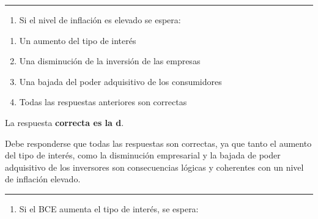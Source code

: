 \documentclass[
  letterpaper,
  DIV=11,
  numbers=noendperiod]{scrreprt}
\providecommand{\tightlist}{%
  \setlength{\itemsep}{0pt}\setlength{\parskip}{0pt}}\usepackage{longtable,booktabs,array}
\begin{document}
\begin{center}\rule{0.5\linewidth}{0.5pt}\end{center}

\begin{enumerate}
\def\labelenumi{\arabic{enumi}.}
\setcounter{enumi}{18}
\tightlist
\item
  Si el nivel de inflación es elevado se espera:
\end{enumerate}

\begin{enumerate}
\def\labelenumi{\alph{enumi})}
\item
  Un aumento del tipo de interés
\item
  Una disminución de la inversión de las empresas
\item
  Una bajada del poder adquisitivo de los consumidores
\item
  Todas las respuestas anteriores son correctas
\end{enumerate}

\begin{tcolorbox}[enhanced jigsaw, left=2mm, opacityback=0, colback=white, breakable, arc=.35mm, bottomrule=.15mm, rightrule=.15mm, toprule=.15mm, leftrule=.75mm, colframe=quarto-callout-tip-color-frame]
\begin{minipage}[t]{5.5mm}
\textcolor{quarto-callout-tip-color}{\faLightbulb}
\end{minipage}%
\begin{minipage}[t]{\textwidth - 5.5mm}

La respuesta \textbf{correcta es la d}.

Debe responderse que todas las respuestas son correctas, ya que tanto el
aumento del tipo de interés, como la disminución empresarial y la bajada
de poder adquisitivo de los inversores son consecuencias lógicas y
coherentes con un nivel de inflación elevado.

\end{minipage}%
\end{tcolorbox}

\begin{center}\rule{0.5\linewidth}{0.5pt}\end{center}

\begin{enumerate}
\def\labelenumi{\arabic{enumi}.}
\setcounter{enumi}{19}
\tightlist
\item
  Si el BCE aumenta el tipo de interés, se espera:
\end{enumerate}
\end{document}
